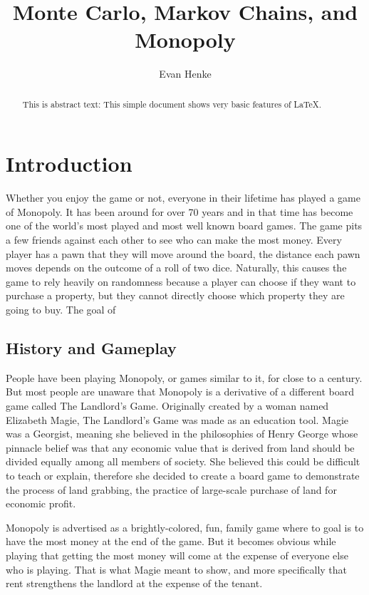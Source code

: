 \documentclass{article}
\begin{document}
\title{Monte Carlo, Markov Chains, and Monopoly}
\author{Evan Henke}

\maketitle

\begin{abstract}
This is abstract text: This simple document shows very basic features of
\LaTeX{}.
\end{abstract}


\section{Introduction}

Whether you enjoy the game or not, everyone in their lifetime has played a game of Monopoly.  It has been around for over 70 years and in that time has become one of the world’s most played and most well known board games.  The game pits a few friends against each other to see who can make the most money.  Every player has a pawn that they will move around the board, the distance each pawn moves depends on the outcome of a roll of two dice.  Naturally, this causes the game to rely heavily on randomness because a player can choose if they want to purchase a property, but they cannot directly choose which property they are going to buy.  The goal of 

\subsection{History and Gameplay}

People have been playing Monopoly, or games similar to it, for close to a century.  But most people are unaware that Monopoly is a derivative of a different board game called The Landlord’s Game.  Originally created by a woman named Elizabeth Magie, The Landlord’s Game was made as an education tool.  Magie was a Georgist, meaning she believed in the philosophies of Henry George whose pinnacle belief was that any economic value that is derived from land should be divided equally among all members of society.  She believed this could be difficult to teach or explain, therefore she decided to create a board game to demonstrate the process of land grabbing, the practice of large-scale purchase of land for economic profit.

	Monopoly is advertised as a brightly-colored, fun, family game where to goal is to have the most money at the end of the game.  But it becomes obvious while playing that getting the most money will come at the expense of everyone else who is playing.  That is what Magie meant to show, and more specifically that rent strengthens the landlord at the expense of the tenant.
\end{document}

